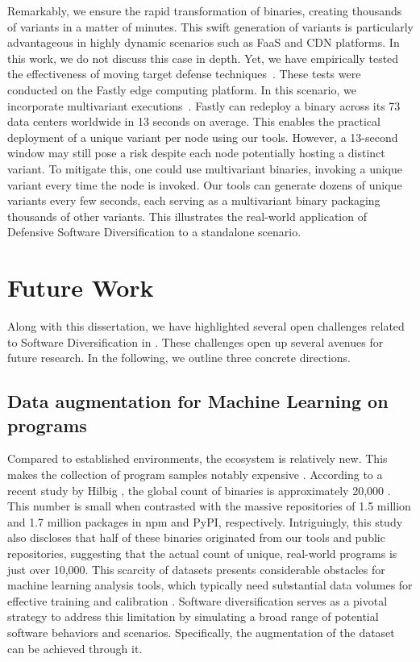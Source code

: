Remarkably, we ensure the rapid transformation of \Wasm binaries, creating thousands of variants in a matter of minutes. 
This swift generation of variants is particularly advantageous in highly dynamic scenarios such as FaaS and CDN platforms. 
In this work, we do not discuss this case in depth. 
Yet, we have empirically tested the effectiveness of moving target defense techniques~\cite{MEWE}. 
These tests were conducted on the Fastly edge computing platform.
In this scenario, we incorporate multivariant executions~\cite{MEWE}. 
Fastly can redeploy a \Wasm binary across its 73 data centers worldwide in 13 seconds on average. 
This enables the practical deployment of a unique variant per node using our tools. 
However, a 13-second window may still pose a risk despite each node potentially hosting a distinct \Wasm variant. 
To mitigate this, one could use multivariant binaries, invoking a unique variant every time the node is invoked. 
Our tools can generate dozens of unique variants every few seconds, each serving as a multivariant binary packaging thousands of other variants. 
This illustrates the real-world application of Defensive Software Diversification to a \Wasm standalone scenario.


\section{Future Work}

Along with this dissertation, we have highlighted several open challenges related to Software Diversification in \Wasm.
These challenges open up several avenues for future research.
In the following, we outline three concrete directions.


\vspace{-0.3cm}
\subsection{Data augmentation for Machine Learning on \Wasm programs}
Compared to established environments, the \Wasm ecosystem is relatively new. This makes the collection of \Wasm program samples notably expensive \cite{Hilbig2021AnES, 10174194}.
According to a recent study by Hilbig \etal, the global count of \Wasm binaries is approximately 20,000  \cite{Hilbig2021AnES}. 
This number is small when contrasted with the massive repositories of 1.5 million and 1.7 million packages in npm and PyPI, respectively. 
Intriguingly, this study also discloses that half of these \Wasm binaries originated from our tools and public repositories, suggesting that the actual count of unique, real-world \Wasm programs is just over 10,000.
This scarcity of \Wasm datasets presents considerable obstacles for machine learning analysis tools, which typically need substantial data volumes for effective training and calibration \cite{2023arXiv230519915Z}.
Software diversification serves as a pivotal strategy to address this limitation by simulating a broad range of potential software behaviors and scenarios. 
Specifically, the augmentation of the \Wasm dataset can be achieved through it.

